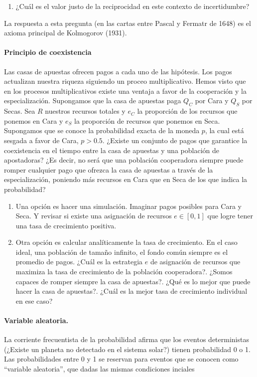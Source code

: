 \documentclass[a4paper,10pt]{article}
\begin{document}
\begin{enumerate}
\item ¿Cuál es el valor justo de la reciprocidad en este contexto de incertidumbre?
\end{enumerate}

La respuesta a esta pregunta (en las cartas entre Pascal y Fermatr de 1648) es el axioma principal de Kolmogorov (1931).

\paragraph{Principio de coexistencia}
Las casas de apuestas ofrecen pagos a cada uno de las hipótesis.
Los pagos actualizan nuestra riqueza siguiendo un proceo multiplicativo.
Hemos visto que en los procesos multiplicativos existe una ventaja a favor de la cooperación y la especialización.
Supongamos que la casa de apuestas paga $Q_C$ por Cara y $Q_S$ por Secas.
Sea $R$ nuestros recursos totales y $e_C$ la proporción de los recursos que ponemos en Cara y $e_S$ la proporción de recursos que ponemos en Seca.
Supongamos que se conoce la probabilidad exacta de la moneda $p$, la cual está sesgada a favor de Cara, $p>0.5$.
¿Existe un conjunto de pagos que garantice la coexistencia en el tiempo entre la casa de apuestas y una población de apostadoras?
¿Es decir, no será que una población cooperadora siempre puede romper cualquier pago que ofrezca la casa de apuestas a través de la especialización, poniendo más recursos en Cara que en Seca de los que indica la probabilidad?

\begin{enumerate}
\item Una opción es hacer una simulación. Imaginar pagos posibles para Cara y Seca. Y revisar si existe una asignación de recursos $e \in [0,1]$ que logre tener una tasa de crecimiento positiva.
\item Otra opción es calcular analíticamente la tasa de crecimiento. En el caso ideal, una población de tamaño infinito, el fondo común siempre es el promedio de pagos. ¿Cuál es la estrategia $e$ de asignación de recursos que maximiza la tasa de crecimiento de la población cooperadora?. ¿Somos capaces de romper siempre la casa de apuestas?. ¿Qué es lo mejor que puede hacer la casa de apuestas?. ¿Cuál es la mejor tasa de crecimiento individual en ese caso?
\end{enumerate}


\newpage

\paragraph{Variable aleatoria.} La corriente frecuentista de la probabilidad afirma que los eventos deterministas (¿Existe un planeta no detectado en el sistema solar?) tienen probabilidad 0 o 1.
Las probabilidades entre 0 y 1 se reservan para eventos que se conocen como ``variable aleatoria'', que dadas las mismas condiciones inciales 
\end{document}
